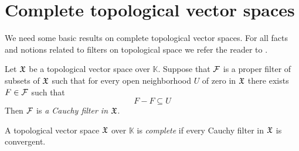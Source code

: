\section{Complete topological vector spaces}
\noindent
We need some basic results on complete topological vector spaces. For all facts and notions related to filters on topological space we refer the reader to \cite{Filters_in_topology}.

\begin{definition}
Let ${\mathfrak X}$ be a topological vector space over $\mathbb{K}$. Suppose that ${\mathcal F}$ is a proper filter of subsets of ${\mathfrak X}$ such that for every open neighborhood $U$ of zero in ${\mathfrak X}$ there exists $F \in {\mathcal F}$ such that
$$F - F \subseteq U$$
Then ${\mathcal F}$ is \textit{a Cauchy filter in ${\mathfrak X}$}.
\end{definition}

\begin{definition}
A topological vector space ${\mathfrak X}$ over $\mathbb{K}$ is \textit{complete} if every Cauchy filter in ${\mathfrak X}$ is convergent.
\end{definition}

